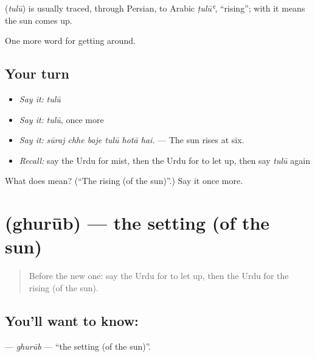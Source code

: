 \begin{cousinweb}
\textbf{} (\emph{tulū}) is usually traced, through Persian, to Arabic \emph{ṭulūʿ}, \textquotedblleft{}rising\textquotedblright{}; with \textbf{} it means the sun comes up.
\end{cousinweb}

\begin{grammarlens}[title={What you've built}]
One more word for getting around.
\end{grammarlens}

\subsection*{Your turn}
\begin{itemize}
\raggedright
  \item \emph{Say it:} \emph{tulū}
  \item \emph{Say it:} \emph{tulū}, once more
  \item \emph{Say it:} \emph{sūraj chhe baje tulū hotā hai.} — The sun rises at six.
  \item \emph{Recall:} say the Urdu for mist, then the Urdu for to let up, then say \emph{tulū} again
\end{itemize}

\begin{tcolorbox}[breakable,colback=teal!4,colframe=teal!35!black,title={Before you move on}]
What does  mean? (\textquotedblleft{}The rising (of the sun)\textquotedblright{}.) Say it once more.
\end{tcolorbox}
\section[\texorpdfstring{\ur{غروب} (ghurūb)}{غروب (ghurūb)}]{ (ghurūb) — the setting (of the sun)}

\label{lesson:UR-C432-ghurub}



\begin{quote}
Before the new one: say the Urdu for to let up, then the Urdu for the rising (of the sun).
\end{quote}

\subsection*{You'll want to know: }
\textbf{} — \emph{ghurūb} — \textquotedblleft{}the setting (of the sun)\textquotedblright{}.


